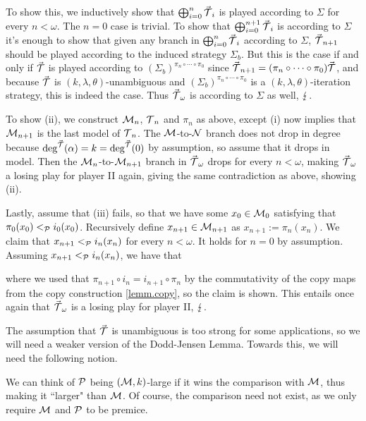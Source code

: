 {\qquad To show this, we inductively show that $\bigoplus_{i=0}^n\vec\T_i$ is played according to $\Sigma$ for every $n<\omega$. The $n=0$ case is trivial. To show that $\bigoplus_{i=0}^{n+1}\vec\T_i$ is according to $\Sigma$ it's enough to show that given any branch in $\bigoplus_{i=0}^n\vec\T_i$ according to $\Sigma$, $\vec\T_{n+1}$ should be played according to the induced strategy $\Sigma_b$. But this is the case if and only if $\vec\T$ is played according to $(\Sigma_b)^{\pi_n\circ\cdots\circ\pi_0}$ since $\vec\T_{n+1}=(\pi_n\circ\cdots\circ\pi_0)\vec\T$, and because $\vec\T$ is $(k,\lambda,\theta)$-unambiguous and $(\Sigma_b)^{\pi_n\circ\cdots\circ\pi_0}$ is a $(k,\lambda,\theta)$-iteration strategy, this is indeed the case. Thus $\vec\T_\omega$ is according to $\Sigma$ as well, $\contr$.

\qquad To show (ii), we construct $\M_n$, $\T_n$ and $\pi_n$ as above, except (i) now implies that $\M_{n+1}$ is the last model of $\T_n$. The $\M$-to-$\N$ branch does not drop in degree because $\deg^{\vec\T}(\alpha)=k=\deg^{\vec\T}(0)$ by assumption, so assume that it drops in model. Then the $\M_n$-to-$\M_{n+1}$ branch in $\vec\T_\omega$ drops for every $n<\omega$, making $\vec\T_\omega$ a losing play for player II again, giving the same contradiction as above, showing (ii).

\qquad Lastly, assume that (iii) fails, so that we have some $x_0\in\M_0$ satisfying that $\pi_0(x_0)<_{\P}i_0(x_0)$. Recursively define $x_{n+1}\in\M_{n+1}$ as $x_{n+1}:=\pi_n(x_n)$. We claim that $x_{n+1}<_{\P}i_n(x_n)$ for every $n<\omega$. It holds for $n=0$ by assumption. Assuming $x_{n+1}<_{\P}i_n(x_n)$, we have that

where we used that $\pi_{n+1}\circ i_n=i_{n+1}\circ\pi_n$ by the commutativity of the copy maps from the copy construction \ref{lemm.copy}, so the claim is shown. This entails once again that $\vec\T_\omega$ is a losing play for player II, $\contr$.
}

The assumption that $\vec\T$ is unambiguous is too strong for some applications, so we will need a weaker version of the Dodd-Jensen Lemma. Towards this, we will need the following notion.


We can think of $\P$ being $(\M,k)$-large if it wins the comparison with $\M$, thus making it ``larger" than $\M$. Of course, the comparison need not exist, as we only require $\M$ and $\P$ to be premice.

